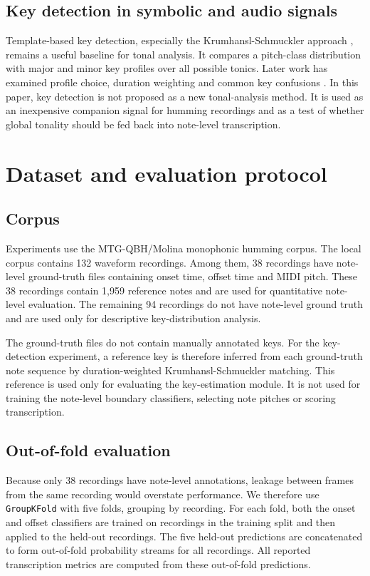 \documentclass[pdflatex,sn-mathphys-num]{sn-jnl}
\begin{document}
\subsection{Key detection in symbolic and audio signals}

Template-based key detection, especially the Krumhansl-Schmuckler approach \cite{krumhansl1982tonal}, remains a useful baseline for tonal analysis. It compares a pitch-class distribution with major and minor key profiles over all possible tonics. Later work has examined profile choice, duration weighting and common key confusions \cite{temperley1999key}. In this paper, key detection is not proposed as a new tonal-analysis method. It is used as an inexpensive companion signal for humming recordings and as a test of whether global tonality should be fed back into note-level transcription.

\section{Dataset and evaluation protocol}\label{sec:data}

\subsection{Corpus}

Experiments use the MTG-QBH/Molina monophonic humming corpus. The local corpus contains 132 waveform recordings. Among them, 38 recordings have note-level ground-truth files containing onset time, offset time and MIDI pitch. These 38 recordings contain 1,959 reference notes and are used for quantitative note-level evaluation. The remaining 94 recordings do not have note-level ground truth and are used only for descriptive key-distribution analysis.

The ground-truth files do not contain manually annotated keys. For the key-detection experiment, a reference key is therefore inferred from each ground-truth note sequence by duration-weighted Krumhansl-Schmuckler matching. This reference is used only for evaluating the key-estimation module. It is not used for training the note-level boundary classifiers, selecting note pitches or scoring transcription.

\subsection{Out-of-fold evaluation}

Because only 38 recordings have note-level annotations, leakage between frames from the same recording would overstate performance. We therefore use \texttt{GroupKFold} with five folds, grouping by recording. For each fold, both the onset and offset classifiers are trained on recordings in the training split and then applied to the held-out recordings. The five held-out predictions are concatenated to form out-of-fold probability streams for all recordings. All reported transcription metrics are computed from these out-of-fold predictions.
\end{document}
